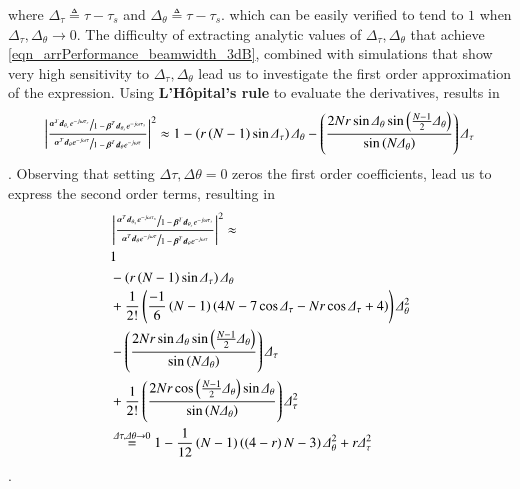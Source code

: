 where $ \Delta_{\tau} \triangleq \tau-\tau_{s} $ and $ \Delta_{\theta} \triangleq \tau-\tau_{s}$.
which can be easily verified to tend to $ 1 $ when $ \Delta_{\tau},\Delta_{\theta} \rightarrow 0$. The difficulty of extracting analytic values of $ \Delta_{\tau},\Delta_{\theta} $ that achieve \ref{eqn_arrPerformance_beamwidth_3dB}, combined with simulations that show very high sensitivity to $ \Delta_{\tau},\Delta_{\theta} $ lead us to investigate the first order approximation of the expression.
Using \textbf{L'Hôpital's rule} to evaluate the derivatives, results in 
\begin{align*}
    \left|
    \frac{
    \sfrac
    {
    \boldsymbol{\alpha}^{T}\boldsymbol{d}_{\theta_{s}}e^{-j\omega\tau_{s}}
    }
    {
    1-\boldsymbol{\beta}^{T}\boldsymbol{d}_{\theta_{s}}e^{-j\omega\tau_{s}}
    }
    }{
    \sfrac
    {
    \boldsymbol{\alpha}^{T}\boldsymbol{d}_{\theta}e^{-j\omega\tau}
    }
    {
    1-\boldsymbol{\beta}^{T}\boldsymbol{d}_{\theta}e^{-j\omega\tau}
    }
    }
    \right|^{2}
    \approx
    1 
    - \left(r\left(N-1\right)\sin{\Delta_{\tau}}\right)\Delta_{\theta}
    - \left(\frac{2Nr\sin{\Delta_{\theta}}\sin{\left(\frac{N-1}{2}\Delta_{\theta}\right)}}{\sin{\left(N\Delta_{\theta}\right)}}\right)\Delta_{\tau}
\end{align*}.
Observing that setting $\Delta{\tau},\Delta{\theta} = 0$ zeros the first order coefficients, lead us to express the second order terms, resulting in 
\begin{equation}
    \begin{split}
        &\left|
        \frac{
        \sfrac
        {
        \boldsymbol{\alpha}^{T}\boldsymbol{d}_{\theta_{s}}e^{-j\omega\tau_{s}}
        }
        {
        1-\boldsymbol{\beta}^{T}\boldsymbol{d}_{\theta_{s}}e^{-j\omega\tau_{s}}
        }
        }{
        \sfrac
        {
        \boldsymbol{\alpha}^{T}\boldsymbol{d}_{\theta}e^{-j\omega\tau}
        }
        {
        1-\boldsymbol{\beta}^{T}\boldsymbol{d}_{\theta}e^{-j\omega\tau}
        }
        }
        \right|^{2}
        \approx \\
        &1 
        \\
        &- \left(r\left(N-1\right)\sin{\Delta_{\tau}}\right)\Delta_{\theta}
        \\
        &+ \frac{1}{2!}\left(\frac{-1}{6}\left(N-1\right)\left(4N-7\cos{\Delta_{\tau}}-Nr\cos{\Delta_{\tau}}+4\right)\right)\Delta^{2}_{\theta}
        \\
        &- \left(\frac{
        2Nr\sin{\Delta_{\theta}}\sin{\left(\frac{N-1}{2}\Delta_{\theta}\right)}
        }{
        \sin{\left(N\Delta_{\theta}\right)}
        }\right)\Delta_{\tau}
        \\
        &+ \frac{1}{2!}\left(\frac{2Nr\cos\left(\frac{N-1}{2}\Delta_{\theta}\right)\sin{\Delta_{\theta}}}{\sin{\left(N\Delta_{\theta}\right)}}\right)\Delta^{2}_{\tau}
        \\
        &\overset{\Delta{\tau},\Delta{\theta} \to 0}{=} 1 - \frac{1}{12}\left(N-1\right)\left(\left(4-r\right)N-3\right)\Delta^{2}_{\theta} + r\Delta^{2}_{\tau}
    \end{split}
\end{equation}.
